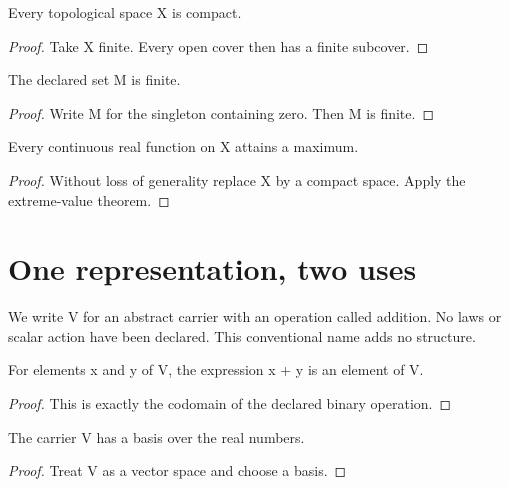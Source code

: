 \begin{theorem}\label{drift}
Every topological space X is compact.
\end{theorem}
\begin{proof}Take X finite. Every open cover then has a finite subcover.\end{proof}

\begin{theorem}\label{shadow}
The declared set M is finite.
\end{theorem}
\begin{proof}Write M for the singleton containing zero. Then M is finite.\end{proof}

\begin{theorem}\label{wlog}
Every continuous real function on X attains a maximum.
\end{theorem}
\begin{proof}Without loss of generality replace X by a compact space. Apply the extreme-value theorem.\end{proof}

\section{One representation, two uses}
We write V for an abstract carrier with an operation called addition. No laws
or scalar action have been declared. This conventional name adds no structure.
\begin{lemma}\label{weak}
For elements x and y of V, the expression x + y is an element of V.
\end{lemma}
\begin{proof}This is exactly the codomain of the declared binary operation.\end{proof}

\begin{theorem}\label{strong}
The carrier V has a basis over the real numbers.
\end{theorem}
\begin{proof}Treat V as a vector space and choose a basis.\end{proof}
